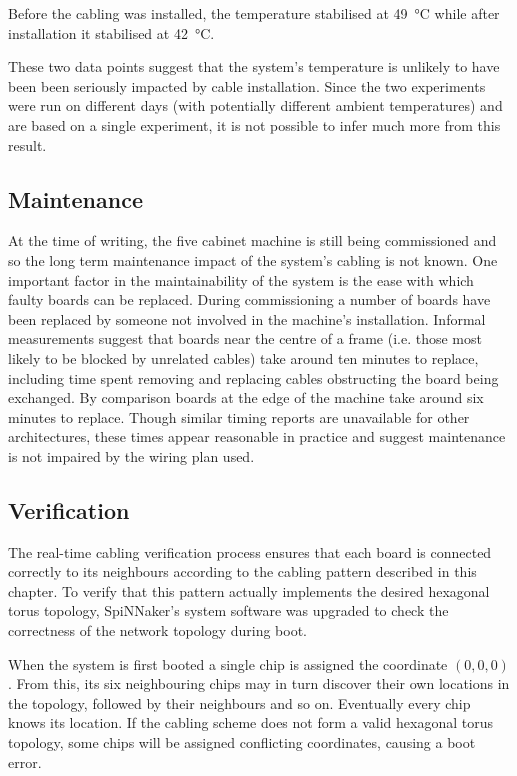 			Before the cabling was installed, the temperature stabilised at
			\SI{49}{\celsius} while after installation it stabilised at
			\SI{42}{\celsius}.
			
			These two data points suggest that the system's temperature is unlikely
			to have been been seriously impacted by cable installation. Since the two
			experiments were run on different days (with potentially different
			ambient temperatures) and are based on a single experiment, it is not
			possible to infer much more from this result.
			
		\subsection{Maintenance}
			
			At the time of writing, the five cabinet machine is still being
			commissioned and so the long term maintenance impact of the system's
			cabling is not known. One important factor in the maintainability of the
			system is the ease with which faulty boards can be replaced. During
			commissioning a number of boards have been replaced by someone not
			involved in the machine's installation. Informal measurements suggest
			that boards near the centre of a frame (i.e. those most likely to be
			blocked by unrelated cables) take around ten minutes to replace,
			including time spent removing and replacing cables obstructing the board
			being exchanged. By comparison boards at the edge of the machine take
			around six minutes to replace. Though similar timing reports are
			unavailable for other architectures, these times appear reasonable in
			practice and suggest maintenance is not impaired by the wiring plan used.
		
		\subsection{Verification}
			
			The real-time cabling verification process ensures that each board is
			connected correctly to its neighbours according to the cabling pattern
			described in this chapter. To verify that this pattern actually
			implements the desired hexagonal torus topology, SpiNNaker's system
			software was upgraded to check the correctness of the network topology
			during boot.
			
			When the system is first booted a single chip is assigned the coordinate
			$(0, 0, 0)$. From this, its six neighbouring chips may in turn discover
			their own locations in the topology, followed by their neighbours and so
			on. Eventually every chip knows its location. If the cabling scheme does
			not form a valid hexagonal torus topology, some chips will be assigned
			conflicting coordinates, causing a boot error.
			
